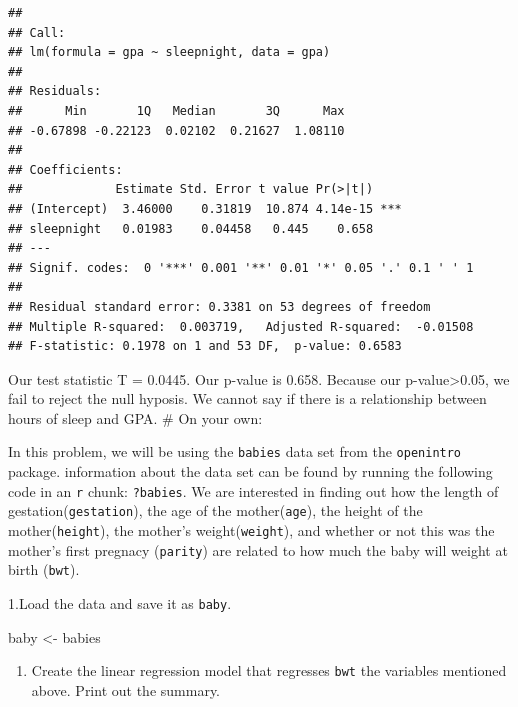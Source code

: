 \documentclass[]{article}
\newenvironment{Shaded}{\begin{snugshade}}{\end{snugshade}}
\newcommand{\KeywordTok}[1]{\textcolor[rgb]{0.13,0.29,0.53}{\textbf{#1}}}
\newcommand{\NormalTok}[1]{#1}
\newcommand{\OperatorTok}[1]{\textcolor[rgb]{0.81,0.36,0.00}{\textbf{#1}}}
\newcommand{\StringTok}[1]{\textcolor[rgb]{0.31,0.60,0.02}{#1}}
\providecommand{\tightlist}{%
  \setlength{\itemsep}{0pt}\setlength{\parskip}{0pt}}
\begin{document}
\begin{Shaded}
\end{Shaded}

\begin{verbatim}
## 
## Call:
## lm(formula = gpa ~ sleepnight, data = gpa)
## 
## Residuals:
##      Min       1Q   Median       3Q      Max 
## -0.67898 -0.22123  0.02102  0.21627  1.08110 
## 
## Coefficients:
##             Estimate Std. Error t value Pr(>|t|)    
## (Intercept)  3.46000    0.31819  10.874 4.14e-15 ***
## sleepnight   0.01983    0.04458   0.445    0.658    
## ---
## Signif. codes:  0 '***' 0.001 '**' 0.01 '*' 0.05 '.' 0.1 ' ' 1
## 
## Residual standard error: 0.3381 on 53 degrees of freedom
## Multiple R-squared:  0.003719,   Adjusted R-squared:  -0.01508 
## F-statistic: 0.1978 on 1 and 53 DF,  p-value: 0.6583
\end{verbatim}

Our test statistic T = 0.0445. Our p-value is 0.658. Because our
p-value\textgreater{}0.05, we fail to reject the null hyposis. We cannot
say if there is a relationship between hours of sleep and GPA. \newpage
\# On your own:

In this problem, we will be using the \texttt{babies} data set from the
\texttt{openintro} package. information about the data set can be found
by running the following code in an \texttt{r} chunk: \texttt{?babies}.
We are interested in finding out how the length of
gestation(\texttt{gestation}), the age of the mother(\texttt{age}), the
height of the mother(\texttt{height}), the mother's
weight(\texttt{weight}), and whether or not this was the mother's first
pregnacy (\texttt{parity}) are related to how much the baby will weight
at birth (\texttt{bwt}).

1.Load the data and save it as \texttt{baby}.

\begin{Shaded}
\begin{Highlighting}[]
\NormalTok{baby <-}\StringTok{ }\NormalTok{babies}
\end{Highlighting}
\end{Shaded}

\begin{enumerate}
\def\labelenumi{\arabic{enumi}.}
\setcounter{enumi}{1}
\tightlist
\item
  Create the linear regression model that regresses \texttt{bwt} the
  variables mentioned above. Print out the summary.
\end{enumerate}
\end{document}
